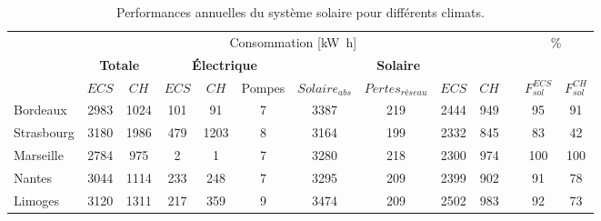 \begin{table}
\small
\centering
\caption{Performances annuelles du système solaire pour différents climats.}
\label{tab:performance_annuelles}
\begin{tabular}{l c c c c c c c c c c c c}
    \toprule
               &   \multicolumn{9}{c}{Consommation [\si{\kilo\watt\hour}]} & & \multicolumn{2}{c}{\multirow{2}{*}{\%}} \\
    \cmidrule(r){2-10}
               & \multicolumn{2}{c}{\textbf{Totale}} &  \multicolumn{3}{c}{\textbf{Électrique}}  & \multicolumn{4}{c}{\textbf{Solaire}} & \\
    \cmidrule(r){2-3}
    \cmidrule(r){4-6}
    \cmidrule(r){7-10}
    \cmidrule(r){12-13}
               & $ECS$    & $CH$      &  $ECS$        & $CH$ & Pompes    & $Solaire_{abs}$  & $Pertes_{réseau}$ & $ECS$  & $CH$ & & $F_{sol}^{ECS}$  & $F_{sol}^{CH}$ \\
    \midrule
    Bordeaux   & \num{2983}     & \num{1024}      &  \num{101}          & \num{91}          &  \num{7}                 & \num{3387}                  & \num{219}       & \num{2444}   &  \num{949}    &   & \num{95}         & \num{91}  \\
    Strasbourg & \num{3180}     & \num{1986}      &  \num{479}          & \num{1203}        &  \num{8}                 & \num{3164}                  & \num{199}       & \num{2332}   &  \num{845}    &   & \num{83}         & \num{42}  \\
    Marseille  & \num{2784}     & \num{975}       &  \num{2}            & \num{1}           &  \num{7}                 & \num{3280}                  & \num{218}       & \num{2300}   &  \num{974}    &   & \num{100}        & \num{100} \\
    Nantes     & \num{3044}     & \num{1114}      &  \num{233}          & \num{248}         &  \num{7}                 & \num{3295}                  & \num{209}       & \num{2399}   &  \num{902}    &   & \num{91}         & \num{78}  \\
    Limoges    & \num{3120}     & \num{1311}      &  \num{217}          & \num{359}         &  \num{9}                 & \num{3474}                  & \num{209}       & \num{2502}   &  \num{983}    &   & \num{92}         & \num{73}  \\
    \bottomrule
\end{tabular}
\end{table}

